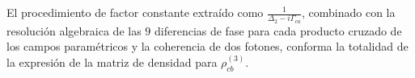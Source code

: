 \documentclass[12pt,a4paper]{article}
\begin{document}
El procedimiento de factor constante extraído como $\frac{1}{\Delta_2 - i\Gamma_{ca}}$, combinado con la resolución algebraica de las $9$ diferencias de fase para cada producto cruzado de los campos paramétricos y la coherencia de dos fotones, conforma la totalidad de la expresión de la matriz de densidad para $\rho_{cb}^{(3)}$.
\end{document}
